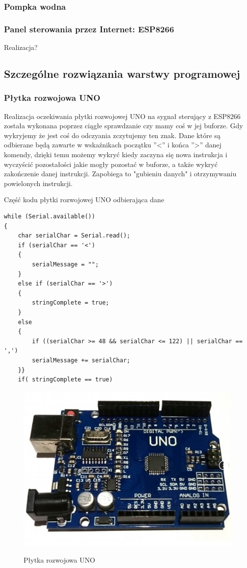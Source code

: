 \documentclass[12pt]{article}
\begin{document}
\subsubsection{Pompka wodna}


\subsubsection{Panel sterowania przez Internet: ESP8266}
Realizacja?

\subsection{Szczególne rozwiązania warstwy programowej}
\subsubsection{Płytka rozwojowa UNO}



Realizacja oczekiwania płytki rozwojowej UNO na sygnał sterujący z ESP8266 została wykonana poprzez ciągłe sprawdzanie czy mamy coś w jej buforze. Gdy wykryjemy że jest coś do odczyania zczytujemy ten znak. Dane które są odbierane będą zawarte w wskaźnikach początku ''<'' i końca ''>'' danej komendy, dzięki temu możemy wykryć kiedy zaczyna się nowa instrukcja i wyczyścić pozostałości jakie mogły pozostać w buforze, a także wykryć zakończenie danej instrukcji. Zapobiega to "gubieniu danych" i otrzymywaniu powielonych instrukcji.
\begin{spverbatim}
	Część kodu płytki rozwojowej UNO odbierająca dane
\end{spverbatim}
\begin{lstlisting}
while (Serial.available()) 
{
	char serialChar = Serial.read(); 
	if (serialChar == '<')  
	{
		serialMessage = "";
	}
	else if (serialChar == '>')
	{
		stringComplete = true;
	}
	else
	{ 
		if ((serialChar >= 48 && serialChar <= 122) || serialChar == ',') 
		serialMessage += serialChar;
	}}
	if( stringComplete == true)
\end{lstlisting}


\begin{figure}[!h]
	\begin{center}
		{\includegraphics[width=12cm]{uno_photo.png}}
	\end{center}
	\caption{Płytka rozwojowa UNO}
\end{figure}
\end{document}
